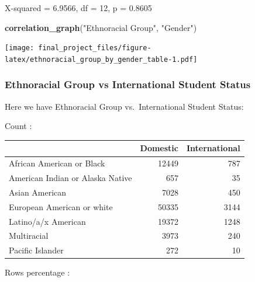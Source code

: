 \documentclass[
  twocolumn]{article}
\newenvironment{Shaded}{\begin{snugshade}}{\end{snugshade}}
\newcommand{\FunctionTok}[1]{\textcolor[rgb]{0.13,0.29,0.53}{\textbf{#1}}}
\newcommand{\NormalTok}[1]{#1}
\newcommand{\SpecialCharTok}[1]{\textcolor[rgb]{0.81,0.36,0.00}{\textbf{#1}}}
\newcommand{\StringTok}[1]{\textcolor[rgb]{0.31,0.60,0.02}{#1}}
\begin{document}
X-squared = 6.9566, df = 12, p = 0.8605

\begin{Shaded}
\begin{Highlighting}[]
\FunctionTok{correlation\_graph}\NormalTok{(}\StringTok{"Ethnoracial Group"}\NormalTok{, }\StringTok{"Gender"}\NormalTok{)}
\end{Highlighting}
\end{Shaded}

\texttt{[image: final\_project\_files/figure-latex/ethnoracial\_group\_by\_gender\_table-1.pdf]}

\subsubsection{Ethnoracial Group vs International Student
Status}\label{ethnoracial-group-vs-international-student-status}

Here we have Ethnoracial Group vs.~International Student Status:

\begin{Shaded}
\end{Shaded}

Count :

\begin{longtable}[]{@{}lrr@{}}
\toprule\noalign{}
& Domestic & International \\
\midrule\noalign{}
\endhead
\bottomrule\noalign{}
\endlastfoot
African American or Black & 12449 & 787 \\
American Indian or Alaska Native & 657 & 35 \\
Asian American & 7028 & 450 \\
European American or white & 50335 & 3144 \\
Latino/a/x American & 19372 & 1248 \\
Multiracial & 3973 & 240 \\
Pacific Islander & 272 & 10 \\
\end{longtable}

Rows percentage :
\end{document}
